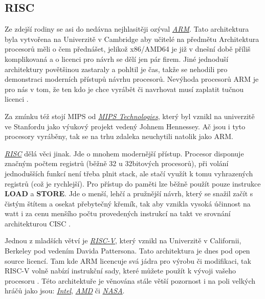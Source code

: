 \documentclass[FM,BP]{tulthesis}
\begin{document}
\subsection{RISC} \label{kap:RISC}
Ze zdejší rodiny se asi do nedávna nejhlasitěji ozýval \href{https://www.arm.com}{\emph{ARM}}. Tato architektura byla vytvořena na Univerzitě v Cambridge \cite{Kumarsahoo472022} aby učitelé na předmětu Architektura procesorů měli o čem přednášet, jelikož x86/AMD64 je již v dnešní době příliš komplikovaná a o licenci pro návrh se dělí jen pár firem. Jiné jednoduší architektury povětšinou zastaraly a pohltil je čas, takže se nehodili pro demonstraci moderních přístupů návrhu procesorů. 
Nevýhoda procesorů ARM je pro nás v tom, že ten kdo je chce vyrábět či navrhovat musí zaplatit tučnou licenci \cite{ARM_licence}.

Za zmínku též stojí MIPS od \href{https://www.mips.com/}{\emph{MIPS Technologies}}, který byl vznikl na univerzitě ve Stanfordu \cite{Mips} jako výukový projekt vedený Johnem Hennessey. Ač jsou i tyto procesory vyráběny, tak se na trhu zdaleka neuchytili natolik jako ARM.

\href{https://www.sifive.com}{\emph{RISC}} dělá věci jinak. Jde o mnohem modernější přístup. Procesor disponuje značným počtem registrů (běžně 32 u 32bitových procesorů), při volání jednodušších funkcí není třeba plnit stack, ale stačí využít k tomu vyhrazených registrů (což je rychlejší). Pro přístup do paměti lze běžně použít pouze instrukce \textbf{LOAD} a \textbf{STORE}. Jde o menší, lehčí a pružnější návrh, který se snažil začít s čistým štítem a osekat přebytečný křemík, tak aby vznikla vysoká účinnost na watt i za cenu menšího počtu provedených instrukcí na takt ve srovnání architekturou CISC \cite{wiki_RISC}.

Jednou z mladších větví je \href{https://en.wikipedia.org/wiki/RISC-V}{\emph{RISC-V}}, který vznikl na Univerzitě v Californii, Berkeley pod vedením Davida Pattersona. Tato architektura je dnes pod open source licencí. Tam kde ARM licencuje svá jádra pro výrobu či modifikaci, tak RISC-V volně nabízí instrukční sady, které můžete použít k vývoji vašeho procesoru \cite{RISC-V_history}. Této architektuře je věnována stále větší pozornost i na poli velkých hráčů jako jsou:  
\href{https://pathfinder.intel.com}{\emph{Intel}},
\href{https://circuitcellar.com/newsletter/amd-is-hiring-risc-v-cpu-developers/}{\emph{AMD}} či
\href{https://www.sifive.com/press/nasa-selects-sifive-and-makes-risc-v-the-go-to-ecosystem}{\emph{NASA}}.
\end{document}
